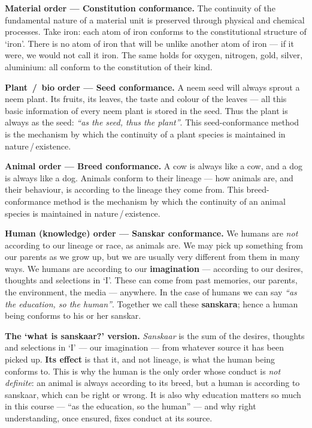 \begin{abul}
\item \textbf{Material order --- Constitution conformance.} The continuity of
      the fundamental nature of a material unit is preserved through physical
      and chemical processes. Take iron: each atom of iron conforms to the
      constitutional structure of `iron'. There is no atom of iron that will
      be unlike another atom of iron --- if it were, we would not call it
      iron. The same holds for oxygen, nitrogen, gold, silver, aluminium: all
      conform to the constitution of their kind.
\item \textbf{Plant \,/\, bio order --- Seed conformance.} A neem seed will
      always sprout a neem plant. Its fruits, its leaves, the taste and colour
      of the leaves --- all this basic information of every neem plant is
      stored in the seed. Thus the plant is always as the seed: \emph{``as the
      seed, thus the plant''}. This seed-conformance method is the mechanism
      by which the continuity of a plant species is maintained in
      nature\,/\,existence.
\item \textbf{Animal order --- Breed conformance.} A cow is always like a cow,
      and a dog is always like a dog. Animals conform to their lineage --- how
      animals are, and their behaviour, is according to the lineage they come
      from. This breed-conformance method is the mechanism by which the
      continuity of an animal species is maintained in nature\,/\,existence.
\item \textbf{Human (knowledge) order --- Sanskar conformance.} We humans are
      \emph{not} according to our lineage or race, as animals are. We may pick
      up something from our parents as we grow up, but we are usually very
      different from them in many ways. We humans are according to our
      \textbf{imagination} --- according to our desires, thoughts and
      selections in `I'. These can come from past memories, our parents, the
      environment, the media --- anywhere. In the case of humans we can say
      \emph{``as the education, so the human''}. Together we call these
      \textbf{sanskara}; hence a human being conforms to his or her sanskar.
\end{abul}

\begin{keybox}
\textbf{\sffamily The `what is sanskaar?' version.} \emph{Sanskaar} is the sum
of the desires, thoughts and selections in `I' --- our imagination --- from
whatever source it has been picked up. \textbf{Its effect} is that it, and not
lineage, is what the human being conforms to. This is why the human is the
only order whose conduct is \emph{not definite}: an animal is always according
to its breed, but a human is according to sanskaar, which can be right or
wrong. It is also why education matters so much in this course --- ``as the
education, so the human'' --- and why right understanding, once ensured, fixes
conduct at its source.
\end{keybox}

